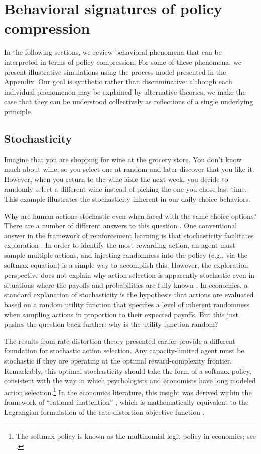 \documentclass[11pt]{article}
\begin{document}
\section{Behavioral signatures of policy compression}

In the following sections, we review behavioral phenomena that can be interpreted in terms of policy compression. For some of these phenomena, we present illustrative simulations using the process model presented in the Appendix. Our goal is synthetic rather than discriminative: although each individual phenomenon may be explained by alternative theories, we make the case that they can be understood collectively as reflections of a single underlying principle.

\subsection{Stochasticity}
Imagine that you are shopping for wine at the grocery store. You don’t know much about wine, so you select one at random and later discover that you like it. However, when you return to the wine aisle the next week, you decide to randomly select a different wine instead of picking the one you chose last time. This example illustrates the stochasticity inherent in our daily choice behaviors.
 
Why are human actions stochastic even when faced with the same choice options? There are a number of different answers to this question \citep[see][]{icard19}. One conventional answer in the framework of reinforcement learning is that stochasticity facilitates exploration \citep{schulz19}. In order to identify the most rewarding action, an agent must sample multiple actions, and injecting randomness into the policy (e.g., via the softmax equation) is a simple way to accomplish this. However, the exploration perspective does not explain why action selection is apparently stochastic even in situations where the payoffs and probabilities are fully known \citep[e.g.,][]{mosteller51}. In economics, a standard explanation of stochasticity is the hypothesis that actions are evaluated based on a random utility function that specifies a level of inherent randomness when sampling actions in proportion to their expected payoffs. But this just pushes the question back further: why is the utility function random?

The results from rate-distortion theory presented earlier provide a different foundation for stochastic action selection. Any capacity-limited agent must be stochastic if they are operating at the optimal reward-complexity frontier. Remarkably, this optimal stochasticity should take the form of a softmax policy, consistent with the way in which psychologists and economists have long modeled action selection.\footnote{The softmax policy is known as the multinomial logit policy in economics; see \citet{mcfadden01}.} In the economics literature, this insight was derived within the framework of ``rational inattention'' \citep{matvejka15}, which is mathematically equivalent to the Lagrangian formulation of the rate-distortion objective function \citep[see Appendix and][]{denti19}.
\end{document}
